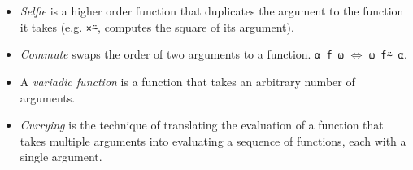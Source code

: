 \begin{itemize}
    \item \textit{Selfie} is a higher order function that duplicates the argument to the function it takes (e.g. \verb|×⍨|, computes the square of its argument).
    \item \textit{Commute} swaps the order of two arguments to a function. \verb|⍺ f ⍵| $\iff$ \verb|⍵ f⍨ ⍺|.
    \item A \textit{variadic function} is a function that takes an arbitrary number of arguments.
    \item \textit{Currying} is the technique of translating the evaluation of a function that takes multiple arguments into evaluating a sequence of functions, each with a single argument.
\end{itemize}
